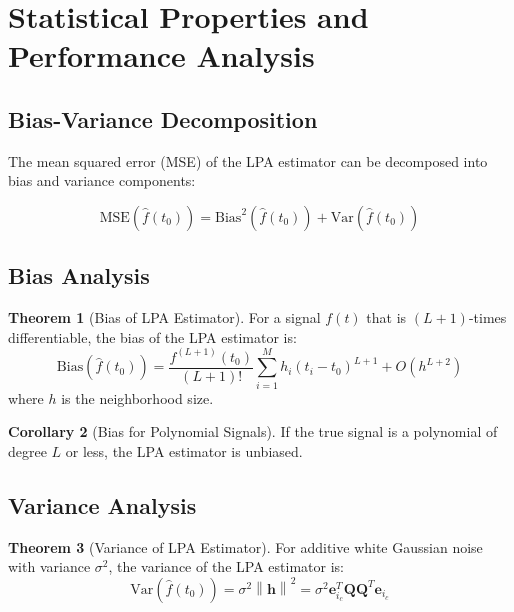 \documentclass[12pt]{article}
\renewcommand{\vec}[1]{\mathbf{#1}}
\newcommand{\mat}[1]{\mathbf{#1}}
\newcommand{\norm}[1]{\left\|#1\right\|}
\theoremstyle{definition}
\newtheorem{theorem}{Theorem}[section]
\newtheorem{corollary}[theorem]{Corollary}
\begin{document}
\newpage

\section{Statistical Properties and Performance Analysis}
\label{sec:statistics}

\subsection{Bias-Variance Decomposition}
\label{subsec:bias_variance}

The mean squared error (MSE) of the LPA estimator can be decomposed into bias and variance components:

\begin{equation}
    \label{eq:mse_decomposition}
    \text{MSE}(\hat{f}(t_0)) = \text{Bias}^2(\hat{f}(t_0)) + \text{Var}(\hat{f}(t_0))
\end{equation}

\subsection{Bias Analysis}
\label{subsec:bias_analysis}

\begin{theorem}[Bias of LPA Estimator]
    \label{thm:bias_lpa}
    For a signal $f(t)$ that is $(L+1)$-times differentiable, the bias of the LPA estimator is:
    \begin{equation}
        \label{eq:bias_formula}
        \text{Bias}(\hat{f}(t_0)) = \frac{f^{(L+1)}(t_0)}{(L+1)!} \sum_{i=1}^{M} h_i (t_i - t_0)^{L+1} + O(h^{L+2})
    \end{equation}
    where $h$ is the neighborhood size.
\end{theorem}

\begin{corollary}[Bias for Polynomial Signals]
    \label{cor:poly_bias}
    If the true signal is a polynomial of degree $L$ or less, the LPA estimator is unbiased.
\end{corollary}

\subsection{Variance Analysis}
\label{subsec:variance_analysis}

\begin{theorem}[Variance of LPA Estimator]
    \label{thm:variance_lpa}
    For additive white Gaussian noise with variance $\sigma^2$, the variance of the LPA estimator is:
    \begin{equation}
        \label{eq:variance_formula}
        \text{Var}(\hat{f}(t_0)) = \sigma^2 \norm{\vec{h}}^2 = \sigma^2 \vec{e}_{i_c}^T \mat{Q}\mat{Q}^T \vec{e}_{i_c}
    \end{equation}
\end{theorem}
\end{document}
